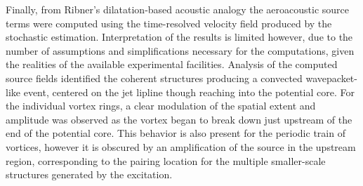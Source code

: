 Finally, from Ribner's dilatation-based acoustic analogy the aeroacoustic source terms were computed using the time-resolved velocity field produced by the stochastic estimation.
Interpretation of the results is limited however, due to the number of assumptions and simplifications necessary for the computations, given the realities of the available experimental facilities.
Analysis of the computed source fields identified the coherent structures producing a convected wavepacket-like event, centered on the jet lipline though reaching into the potential core.
For the individual vortex rings, a clear modulation of the spatial extent and amplitude was observed as the vortex began to break down just upstream of the end of the potential core.
This behavior is also present for the periodic train of vortices, however it is obscured by an amplification of the source in the upstream region, corresponding to the pairing location for the multiple smaller-scale structures generated by the excitation. 


